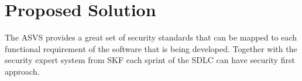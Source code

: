 \section{Proposed Solution}
The ASVS provides a great set of security standards that can be mapped to each functional requirement of the software that is being developed. Together with the security expert system from SKF each sprint of the SDLC can have security first approach. 
